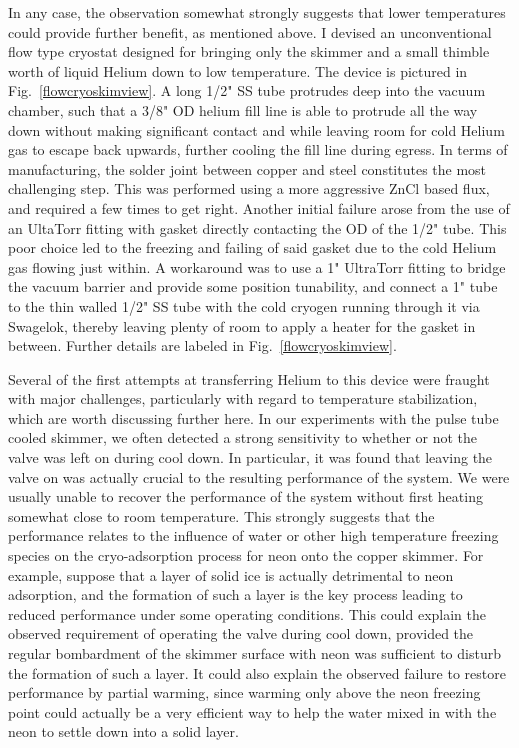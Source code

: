 In any case, the observation somewhat strongly suggests that lower temperatures could provide further benefit, as mentioned above.
I devised an unconventional flow type cryostat designed for bringing only the skimmer and a small thimble worth of liquid Helium down to low temperature.
The device is pictured in Fig.~\ref{flowcryoskimview}.
A long 1/2" SS tube protrudes deep into the vacuum chamber, such that a 3/8" OD helium fill line is able to protrude all the way down without making significant contact and while leaving room for cold Helium gas to escape back upwards, further cooling the fill line during egress.
In terms of manufacturing, the solder joint between copper and steel constitutes the most challenging step.
This was performed using a more aggressive ZnCl based flux, and required a few times to get right.
Another initial failure arose from the use of an UltaTorr fitting with gasket directly contacting the OD of the 1/2" tube.
This poor choice led to the freezing and failing of said gasket due to the cold Helium gas flowing just within.
A workaround was to use a 1" UltraTorr fitting to bridge the vacuum barrier and provide some position tunability, and connect a 1" tube to the thin walled 1/2" SS tube with the cold cryogen running through it via Swagelok, thereby leaving plenty of room to apply a heater for the gasket in between.
Further details are labeled in Fig.~\ref{flowcryoskimview}.

Several of the first attempts at transferring Helium to this device were fraught with major challenges, particularly with regard to temperature stabilization, which are worth discussing further here.
In our experiments with the pulse tube cooled skimmer, we often detected a strong sensitivity to whether or not the valve was left on during cool down.
In particular, it was found that leaving the valve on was actually crucial to the resulting performance of the system.
We were usually unable to recover the performance of the system without first heating somewhat close to room temperature.
This strongly suggests that the performance relates to the influence of water or other high temperature freezing species on the cryo-adsorption process for neon onto the copper skimmer.
For example, suppose that a layer of solid ice is actually detrimental to neon adsorption, and the formation of such a layer is the key process leading to reduced performance under some operating conditions.
This could explain the observed requirement of operating the valve during cool down, provided the regular bombardment of the skimmer surface with neon was sufficient to disturb the formation of such a layer.
It could also explain the observed failure to restore performance by partial warming, since warming only above the neon freezing point could actually be a very efficient way to help the water mixed in with the neon to settle down into a solid layer.

